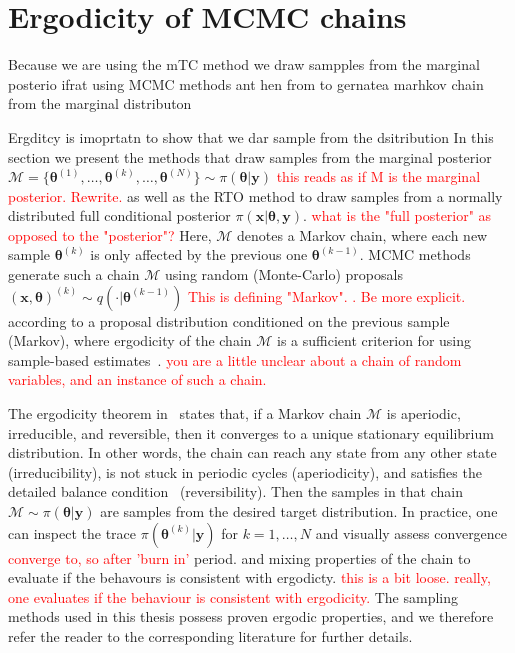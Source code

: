 \section{Ergodicity of MCMC chains}
Because we are using the mTC method we draw sampples from the marginal posterio ifrat using MCMC methods ant hen from  to gernatea marhkov chain from the marginal distributon


Ergditcy is imoprtatn to show that we dar sample from the dsitribution
In this section we present the methods that draw samples from the marginal posterior $ \mathcal{M} = \{  \bm{\theta}^{(1)}, \dots,  \bm{\theta}^{(k)}, \dots, \bm{\theta}^{(N)} \} \sim \pi(\bm{\theta} |  \bm{y})$ \textcolor{red}{this reads as if M is the marginal posterior. Rewrite.} as well as the RTO method to draw samples from a normally distributed full conditional posterior $\pi(\bm{x}|\bm{\theta} , \bm{y})$. \textcolor{red}{what is the "full posterior" as opposed to the "posterior"?}
Here, $\mathcal{M}$ denotes a Markov chain, where each new sample $\bm{\theta}^{(k)}$ is only affected by the previous one $\bm{\theta}^{(k-1)}$.
MCMC methods generate such a chain $\mathcal{M}$ using random (Monte-Carlo) proposals $(\bm{x}, \bm{\theta})^{(k)} \sim q( \cdot |  \bm{\theta}^{(k-1)})$ \textcolor{red}{This is defining "Markov". . Be more explicit.} according to a proposal distribution conditioned on the previous sample (Markov), where ergodicity of the chain $\mathcal{M}$ is a sufficient criterion for using sample-based estimates~\cite{tan2016LecNot, roberts2004general}. \textcolor{red}{you are a little unclear about a chain of random variables, and an instance of such a chain.}

The ergodicity theorem in~\cite{tan2016LecNot} states that, if a Markov chain $\mathcal{M}$ is aperiodic, irreducible, and reversible, then it converges to a unique stationary equilibrium distribution.
In other words, the chain can reach any state from any other state (irreducibility), is not stuck in periodic cycles (aperiodicity), and satisfies the detailed balance condition~\cite{tan2016LecNot} (reversibility).
Then the samples in that chain $ \mathcal{M} \sim \pi( \bm{\theta} |  \bm{y})$ are samples from the desired target distribution.
In practice, one can inspect the trace $\pi(\bm{\theta}^{(k)} |  \bm{y})$ for $k = 1, \dots, N$ and visually assess convergence  \textcolor{red}{converge to, so after 'burn in'}  period.
and mixing properties of the chain to evaluate if the behavours is consistent with ergodicty.
\textcolor{red}{this is a bit loose. really, one evaluates if the behaviour is consistent with ergodicity.}
The sampling methods used in this thesis possess proven ergodic properties, and we therefore refer the reader to the corresponding literature for further details. 

